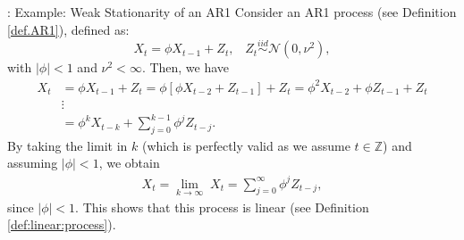 \documentclass[envcountsect,usenames,dvipsnames]{beamer}
\def\simiid{\stackrel{iid}{\sim}}
\theoremstyle{mystyle}
\begin{document}
\begin{frame}{\thesubsection: Example: Weak Stationarity of an AR1}
\small
  Consider an AR1 process (see Definition \ref{def.AR1}), defined as:
  \begin{equation*}
      X_t = \phi X_{t-1} + Z_t, \;\;\; Z_t \simiid \mathcal{N}(0,\nu^2),
  \end{equation*}
  with $|\phi| < 1$ and $\nu^2 < \infty$. Then, we have
\[\begin{aligned}
  {X_t} & =  {\phi }{X_{t - 1}} + {Z_t} = \phi \left[ {\phi {X_{t - 2}} + {Z_{t - 1}}} \right] + {Z_t} 
    =  {\phi ^2}{X_{t - 2}} + \phi {Z_{t - 1}} + {Z_t}  \\
   &  \vdots  \\
   & =  {\phi ^k}{X_{t-k}} + \sum\limits_{j = 0}^{k - 1} {{\phi ^j}{Z_{t - j}}} .
\end{aligned} \]
%
By taking the limit in $k$ (which is perfectly valid as we 
assume $t \in \mathbb{Z}$) and assuming $|\phi|<1$, we obtain
%
\begin{equation}
\begin{aligned}
  X_t = \mathop {\lim }\limits_{k \to \infty} \; {X_t}  =  \sum\limits_{j = 0}^{\infty} {{\phi ^j}{Z_{t - j}}} ,
\end{aligned}
\label{eq:ar1:linear}
\end{equation}
%
since $| \phi | < 1$. This shows that this process is linear (see Definition \ref{def:linear:process}).
\end{frame}
\end{document}
